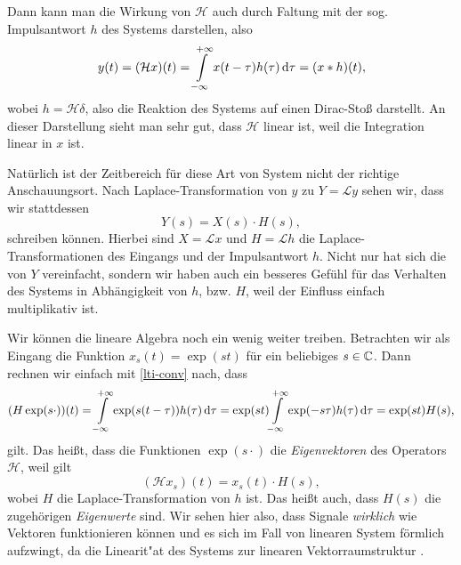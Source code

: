 Dann kann man die Wirkung von $\mathcal{H}$ auch durch Faltung mit der sog. Impulsantwort $h$ des Systems darstellen, also
%
\begin{equation}\label{lti-conv}
    y(t) 
        = (\mathcal{H}x)(t) 
        = {\int\limits_{-\infty}^{+\infty}{x(t - \tau) h(\tau)}\,\mathrm{d}{\tau}} 
        = (x \ast h)(t),
\end{equation}
%
wobei $h = \mathcal{H}\delta$, also die Reaktion des Systems auf einen Dirac-Sto\ss{} darstellt.
An dieser Darstellung sieht man sehr gut, dass $\mathcal{H}$ linear ist, weil die Integration linear in $x$ ist.

Nat\"urlich ist der Zeitbereich f\"ur diese Art von System nicht der richtige Anschauungsort. 
Nach Laplace-Transformation von $y$ zu $Y = \mathcal{L}y$ sehen wir, dass wir stattdessen 
\[
Y(s) = X(s) \cdot H(s),
\]
schreiben k\"onnen. 
Hierbei sind $X = \mathcal{L}x$ und $H = \mathcal{L}h$ die Laplace-Transformationen des Eingangs und der Impulsantwort $h$.
Nicht nur hat sich die  von $Y$ vereinfacht, sondern wir haben auch ein besseres Gef\"uhl f\"ur das Verhalten des Systems in Abh\"angigkeit von $h$, bzw. $H$, weil der Einfluss einfach multiplikativ ist.

Wir k\"onnen die lineare Algebra noch ein wenig weiter treiben. Betrachten wir als Eingang die Funktion $x_s(t) = \exp(s t)$ f\"ur ein beliebiges $s \in \mathbb{C}$.
Dann rechnen wir einfach mit \eqref{lti-conv} nach, dass
\[
(H\exp(s\cdot))(t) 
    = {\int\limits_{-\infty}^{+\infty}{\exp(s (t-\tau))h(\tau)}\,\mathrm{d}{\tau}}
    = \exp(s t) {\int\limits_{-\infty}^{+\infty}{\exp(-s\tau)h(\tau)}\,\mathrm{d}{\tau}}
    = \exp(s t) H(s),
\]
gilt. Das hei\ss{}t, dass die Funktionen $\exp(s \cdot)$ die \emph{Eigenvektoren} des Operators $\mathcal{H}$, weil gilt 
\[
    (\mathcal{H} x_s)(t) = x_s(t) \cdot H(s),
\]
wobei $H$ die Laplace-Transformation von $h$ ist.
Das hei\ss{}t auch, dass $H(s)$ die zugeh\"origen \emph{Eigenwerte} sind.
Wir sehen hier also, dass Signale \emph{wirklich} wie Vektoren funktionieren k\"onnen und es sich im Fall von linearen System f\"ormlich aufzwingt, da die Linearit"at des Systems zur linearen Vektorraumstruktur .
